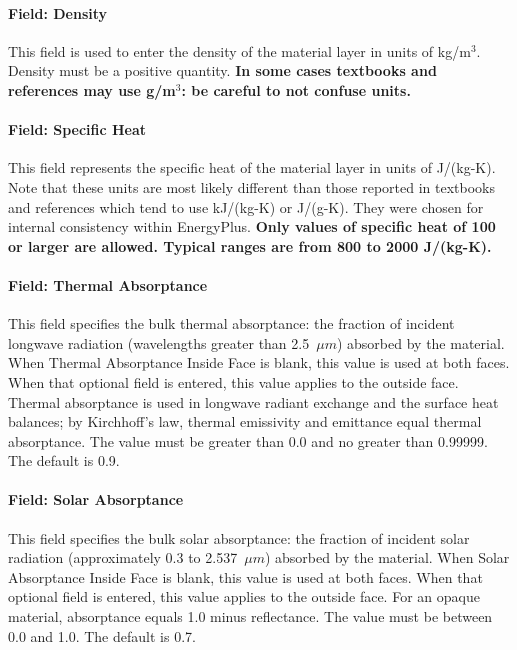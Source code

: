 \paragraph{Field: Density}\label{field-density}

This field is used to enter the density of the material layer in units of kg/m\(^{3}\). Density must be a positive quantity. \textbf{In some cases textbooks and references may use g/m\(^{3}\): be careful to not confuse units.}

\paragraph{Field: Specific Heat}\label{field-specific-heat}

This field represents the specific heat of the material layer in units of J/(kg-K). Note that these units are most likely different than those reported in textbooks and references which tend to use kJ/(kg-K) or J/(g-K). They were chosen for internal consistency within EnergyPlus. \textbf{Only values of specific heat of 100 or larger are allowed. Typical ranges are from 800 to 2000 J/(kg-K).}

\paragraph{Field: Thermal Absorptance}\label{field-thermal-absorptance}

This field specifies the bulk thermal absorptance: the fraction of incident longwave radiation (wavelengths greater than 2.5~$\mu{}m$) absorbed by the material. When Thermal Absorptance Inside Face is blank, this value is used at both faces. When that optional field is entered, this value applies to the outside face. Thermal absorptance is used in longwave radiant exchange and the surface heat balances; by Kirchhoff's law, thermal emissivity and emittance equal thermal absorptance. The value must be greater than 0.0 and no greater than 0.99999. The default is 0.9.

\paragraph{Field: Solar Absorptance}\label{field-solar-absorptance}

This field specifies the bulk solar absorptance: the fraction of incident solar radiation (approximately 0.3 to 2.537~$\mu{}m$) absorbed by the material. When Solar Absorptance Inside Face is blank, this value is used at both faces. When that optional field is entered, this value applies to the outside face. For an opaque material, absorptance equals 1.0 minus reflectance. The value must be between 0.0 and 1.0. The default is 0.7.

